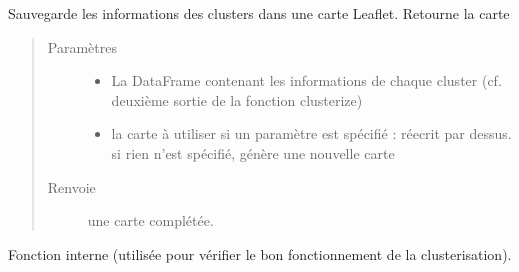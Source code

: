 \documentclass[letterpaper,10pt,french]{sphinxmanual}
\begin{document}
\begin{fulllineitems}
\label{\detokenize{index:src.clusterizer.clusterizer.save_to_map}}
\sphinxAtStartPar
Sauvegarde les informations des clusters dans une carte Leaflet.
Retourne la carte
\begin{quote}\begin{description}
\item[{Paramètres}] \leavevmode\begin{itemize}
\item {} 
\sphinxAtStartPar
{} \textendash{} La DataFrame contenant les informations de chaque cluster
(cf. deuxième sortie de la fonction clusterize)

\item {} 
\sphinxAtStartPar
{} \textendash{} la carte à utiliser
si un paramètre est spécifié : réecrit par dessus.
si rien n’est spécifié, génère une nouvelle carte

\end{itemize}

\item[{Renvoie}] \leavevmode
\sphinxAtStartPar
une carte complétée.

\end{description}\end{quote}

\end{fulllineitems}


\begin{fulllineitems}
\label{\detokenize{index:src.clusterizer.clusterizer.test_geojson}}
\sphinxAtStartPar
Fonction interne (utilisée pour vérifier le bon fonctionnement de la clusterisation).

\end{fulllineitems}
\end{document}

